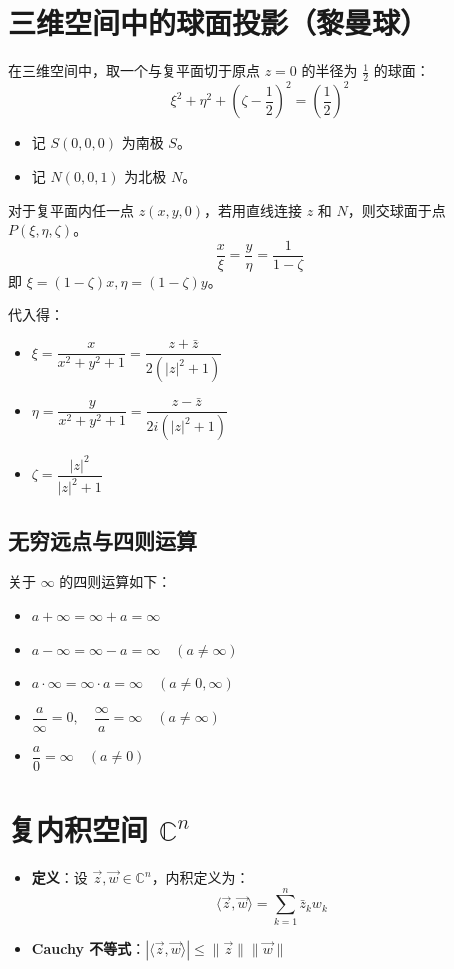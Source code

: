 \section{三维空间中的球面投影（黎曼球）}
在三维空间中，取一个与复平面切于原点 $z=0$ 的半径为 $\frac{1}{2}$ 的球面：
$$\xi^2 + \eta^2 + \left(\zeta - \frac{1}{2}\right)^2 = \left(\frac{1}{2}\right)^2$$
\begin{itemize}
	\item 记 $S(0, 0, 0)$ 为南极 $S$。
	\item 记 $N(0, 0, 1)$ 为北极 $N$。
\end{itemize}

对于复平面内任一点 $z(x, y, 0)$，若用直线连接 $z$ 和 $N$，则交球面于点 $P(\xi, \eta, \zeta)$。
$$\frac{x}{\xi} = \frac{y}{\eta} = \frac{1}{1-\zeta}$$
即 $\xi = (1-\zeta)x, \eta = (1-\zeta)y$。

代入得：
\begin{itemize}
	\item $\xi = \dfrac{x}{x^2+y^2+1} = \dfrac{z+\bar{z}}{2(|z|^2+1)}$
	\item $\eta = \dfrac{y}{x^2+y^2+1} = \dfrac{z-\bar{z}}{2i(|z|^2+1)}$
	\item $\zeta = \dfrac{|z|^2}{|z|^2+1}$
\end{itemize}

\subsection{无穷远点与四则运算}
\begin{tcolorbox}[title=无穷远点的四则运算规则, colframe=orange!75!black, colback=orange!5!white, sharp corners]
	关于 $\infty$ 的四则运算如下：
	\begin{itemize}
		\item $a + \infty = \infty + a = \infty$
		\item $a - \infty = \infty - a = \infty \quad (a \neq \infty)$
		\item $a \cdot \infty = \infty \cdot a = \infty \quad (a \neq 0, \infty)$
		\item $\dfrac{a}{\infty} = 0, \quad \dfrac{\infty}{a} = \infty \quad (a \neq \infty)$
		\item $\dfrac{a}{0} = \infty \quad (a \neq 0)$
	\end{itemize}
\end{tcolorbox}

\section{复内积空间 $\mathbb{C}^n$}
\begin{tcolorbox}[colframe=purple!50!black, colback=purple!5!white]
	\begin{itemize}
		\item \textbf{定义}：设 $\vec{z}, \vec{w} \in \mathbb{C}^n$，内积定义为：
		$$\langle \vec{z}, \vec{w} \rangle = \sum_{k=1}^{n} \bar{z}_k w_k$$
		\item \textbf{Cauchy 不等式}：$|\langle \vec{z}, \vec{w} \rangle| \le \|\vec{z}\| \|\vec{w}\|$
	\end{itemize}
\end{tcolorbox}

